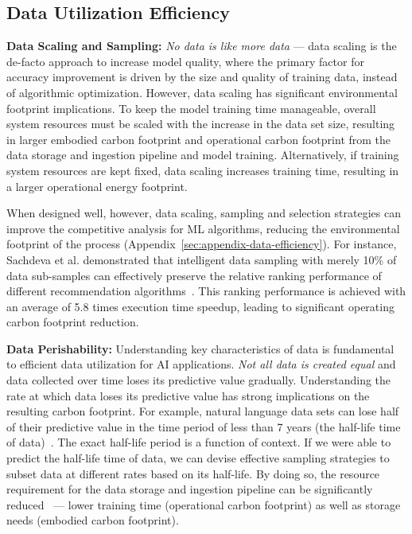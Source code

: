 \subsection{Data Utilization Efficiency}
\label{sec:data}

\textbf{Data Scaling and Sampling:} \textit{No data is like more data} --- data scaling is the de-facto approach to increase model quality, where the primary factor for accuracy improvement is driven by the size and quality of training data, instead of algorithmic optimization. However, data scaling has significant environmental footprint implications. 
To keep the model training time manageable, overall system resources must be scaled with the increase in the data set size, resulting in larger embodied carbon footprint and operational carbon footprint from the data storage and ingestion pipeline and model training. 
Alternatively, if training system resources are kept fixed, data scaling increases training time, resulting in a larger operational energy footprint. 

When designed well, however, data scaling, sampling and selection strategies can improve the competitive analysis for ML algorithms, reducing the environmental footprint of the process (Appendix~\ref{sec:appendix-data-efficiency}). For instance, Sachdeva et al. demonstrated that intelligent data sampling with merely 10\% of data sub-samples can effectively preserve the relative ranking performance of different recommendation algorithms~\cite{Sachdeva:arxiv:2021}. This ranking performance is achieved with an average of 5.8 times execution time speedup, leading to significant operating carbon footprint reduction.

\textbf{Data Perishability:} Understanding key characteristics of data is fundamental to efficient data utilization for AI applications. \textit{Not all data is created equal} and data collected over time loses its predictive value gradually. 
Understanding the rate at which data loses its predictive value has strong implications on the resulting carbon footprint.
For example, natural language data sets can lose half of their predictive value in the time period of less than 7 years (the half-life time of data)~\cite{valavi:hbs:2020}. The exact half-life period is a function of context. If we were able to predict the half-life time of data, we can devise effective sampling strategies to subset data at different rates based on its half-life. 
By doing so, the resource requirement for the data storage and ingestion pipeline can be significantly reduced~\cite{Zhao:arxiv:2021} --- lower training time (operational carbon footprint) as well as storage needs (embodied carbon footprint).  


